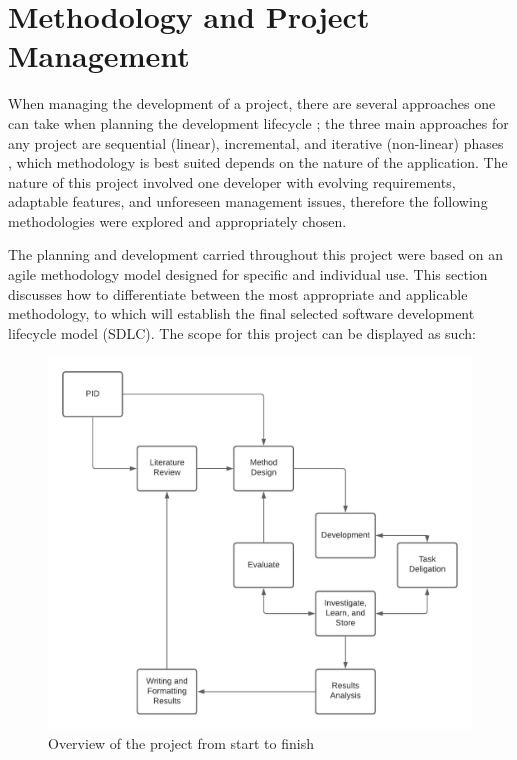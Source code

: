 \chapter{Methodology and Project Management}

When managing the development of a project, there are several approaches one can take when planning the development lifecycle \parencite{shylesh2017study}; the three main approaches for any project are sequential (linear), incremental, and iterative (non-linear) phases \parencite{akinsola2020comparative}, which methodology is best suited depends on the nature of the application. The nature of this project involved one developer with evolving requirements, adaptable features, and unforeseen management issues, therefore the following methodologies were explored and appropriately chosen.

The planning and development carried throughout this project were based on an agile methodology model designed for specific and individual use. This section discusses how to differentiate between the most appropriate and applicable methodology, to which will establish the final selected software development lifecycle model (SDLC). The scope for this project can be displayed as such:

\begin{figure}[H]
    \centering
    \includegraphics[width=\textwidth]{figures/chapter-3/ProjectOverviewFlowChart.pdf}
    \caption[Overview of Project Workflow]{Overview of the project from start to finish
    \label{fig:ProjectWorkflow}}
\end{figure}

